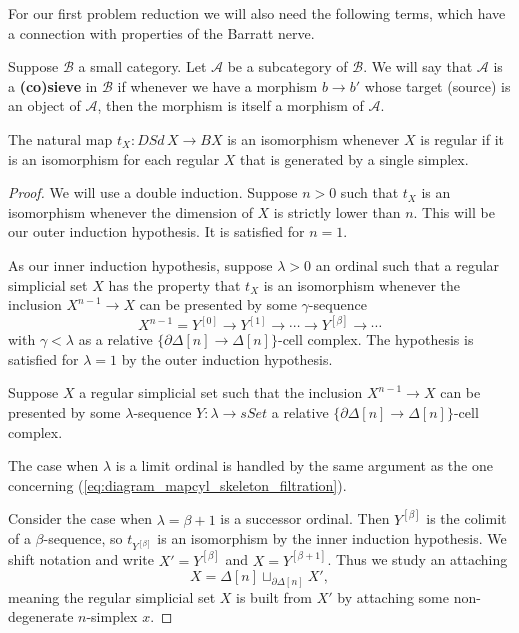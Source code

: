 For our first problem reduction we will also need the following terms, which have a connection with properties of the Barratt nerve.
\begin{definition}
Suppose $\mathscr{B}$ a small category. Let $\mathscr{A}$ be a subcategory of $\mathscr{B}$. We will say that $\mathscr{A}$ is a \textbf{(co)sieve} in $\mathscr{B}$ if whenever we have a morphism $b\to b'$ whose target (source) is an object of $\mathscr{A}$, then the morphism is itself a morphism of $\mathscr{A}$.
\end{definition}
\begin{lemma}\label{lem:first_reduction}
The natural map $t_X:DSd\, X\to BX$ is an isomorphism whenever $X$ is regular if it is an isomorphism for each regular $X$ that is generated by a single simplex.
\end{lemma}
\begin{proof}
We will use a double induction. Suppose $n>0$ such that $t_X$ is an isomorphism whenever the dimension of $X$ is strictly lower than $n$. This will be our outer induction hypothesis. It is satisfied for $n=1$.

As our inner induction hypothesis, suppose $\lambda >0$ an ordinal such that a regular simplicial set $X$ has the property that $t_X$ is an isomorphism whenever the inclusion $X^{n-1}\to X$ can be presented by some $\gamma$-sequence
\[X^{n-1}=Y^{[0]}\to Y^{[1]}\to \cdots \to Y^{[\beta ]}\to \cdots \]
with $\gamma <\lambda$ as a relative $\{ \partial \Delta [n]\to \Delta [n]\}$-cell complex. The hypothesis is satisfied for $\lambda =1$ by the outer induction hypothesis.

Suppose $X$ a regular simplicial set such that the inclusion $X^{n-1}\to X$ can be presented by some $\lambda$-sequence $Y:\lambda \to sSet$ a relative $\{ \partial \Delta [n]\to \Delta [n]\}$-cell complex.

The case when $\lambda$ is a limit ordinal is handled by the same argument as the one concerning (\ref{eq:diagram_mapcyl_skeleton_filtration}).

Consider the case when $\lambda =\beta +1$ is a successor ordinal. Then $Y^{[\beta ]}$ is the colimit of a $\beta$-sequence, so $t_{Y^{[\beta ]}}$ is an isomorphism by the inner induction hypothesis. We shift notation and write $X'=Y^{[\beta ]}$ and $X=Y^{[\beta +1]}$. Thus we study an attaching
\[X=\Delta [n]\sqcup _{\partial \Delta [n]}X',\]
meaning the regular simplicial set $X$ is built from $X'$ by attaching some non-degenerate $n$-simplex $x$.


\end{proof}
